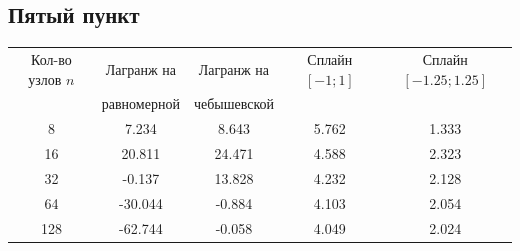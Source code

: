 \documentclass[12pt, a4paper]{article}
\begin{document}
\subsection{Пятый пункт}

\noindent\begin{center}
\hspace*{-25mm}\begin{tabular}{|c|c|c|c|c|}
\hline
Кол-во узлов $n$ & Лагранж на   & Лагранж на& Сплайн $[-1;1]$  & Сплайн $[-1{.}25 ; 1{.}25 ]$  \\
 & равномерной  & чебышевской&   &  \\
\hline
8 &   7{.}234&   8{.}643&   5{.}762     &1{.}333 \\
\hline
16&20{.}811 &24{.}471    &4{.}588     &2{.}323\\
\hline
32&-0{.}137 &13{.}828      &4{.}232    &2{.}128\\
\hline
64&-30{.}044 &-0{.}884  &4{.}103      &2{.}054\\
\hline
128&-62{.}744&-0{.}058   &4{.}049      &2{.}024\\
\hline
\end{tabular}
\end{center}

\pagebreak
\end{document}
